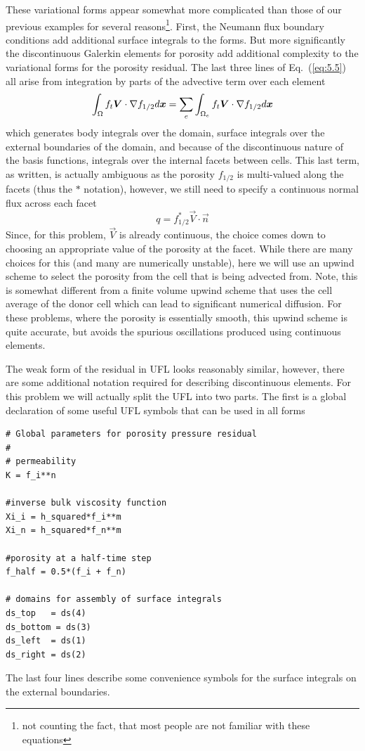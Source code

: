 These variational forms appear somewhat more complicated than those of
our previous examples for several reasons\footnote{not counting the fact, that
most people are not familiar with these equations}.  First,  the
Neumann flux boundary conditions add additional surface integrals to
the forms.  But more significantly the discontinuous Galerkin elements
for porosity add additional complexity to the variational forms for
the porosity residual.  The last three lines of Eq.\ (\ref{eq:5.5}) all arise from
integration by parts of the advective term over each element
\begin{displaymath}
  \int_{\Omega} f_{t}{\mbox{\boldmath$V$}}\cdot\nabla f_{1/2} d{\mbox{\boldmath$x$}} = \sum_e \int_{\Omega_{e}} f_{t}{\mbox{\boldmath$V$}}\cdot\nabla f_{1/2} d{\mbox{\boldmath$x$}}
\end{displaymath}
which generates body integrals over the domain,  surface integrals
over the external boundaries of the domain,  and because of the
discontinuous nature of the basis functions,  integrals over the
internal facets between cells.  This last term, as written, is
actually ambiguous as the porosity
$f_{1/2}$ is  multi-valued along the facets (thus the $*$ notation),
however, we still need to specify a continuous normal flux across each
facet 
\begin{equation}
  \label{eq5:flux}
    q = f_{1/2}^{*}\vec{V}\cdot\vec{n}
\end{equation}
Since, for this problem, $\vec{V}$ is already continuous, the choice
comes down to choosing an appropriate value of the porosity at the
facet. While there are many choices for this (and many are numerically
unstable), here we  will use an upwind scheme to select the
porosity from the cell that is being advected from.  Note, this is
somewhat different from a finite volume upwind scheme that uses the
cell average of the donor cell which can lead to significant numerical
diffusion.  For these problems, where the porosity is essentially smooth,
this upwind scheme is quite accurate, but avoids the spurious
oscillations produced using continuous elements.

The weak form of the residual in UFL looks reasonably
similar, however, there are some additional notation required for
describing discontinuous elements.  For this problem we will actually
split the UFL into two parts.  The first is a global declaration of
some useful UFL symbols that can be used in all forms
\begin{lstlisting}[style=UFL]
# Global parameters for porosity pressure residual 
#
# permeability
K = f_i**n

#inverse bulk viscosity function
Xi_i = h_squared*f_i**m
Xi_n = h_squared*f_n**m

#porosity at a half-time step
f_half = 0.5*(f_i + f_n)

# domains for assembly of surface integrals
ds_top   = ds(4)
ds_bottom = ds(3)
ds_left  = ds(1)
ds_right = ds(2)
\end{lstlisting}
The last four lines describe some convenience symbols for the
surface integrals on the external boundaries. 

